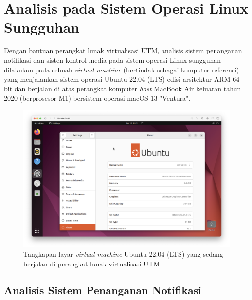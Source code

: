 \section{Analisis pada Sistem Operasi Linux Sungguhan}

Dengan bantuan perangkat lunak virtualisasi UTM, analisis sistem penanganan notifikasi dan sisten kontrol media pada sistem operasi Linux sungguhan dilakukan pada sebuah \textit{virtual machine} (bertindak sebagai komputer referensi) yang menjalankan sistem operasi Ubuntu 22.04 (LTS) edisi arsitektur ARM 64-bit dan berjalan di atas perangkat komputer \textit{host} MacBook Air keluaran tahun 2020 (berprosesor M1) bersistem operasi macOS 13 "Ventura".

\begin{figure}[h]
    \centering
    \includegraphics[width=1\linewidth]{assets/Screenshot 2023-12-19 at 10.51.04.png}
    \caption{Tangkapan layar \textit{virtual machine} Ubuntu 22.04 (LTS) yang sedang berjalan di perangkat lunak virtualisasi UTM}
    \label{fig:enter-label}
\end{figure}

\subsection{Analisis Sistem Penanganan Notifikasi}

